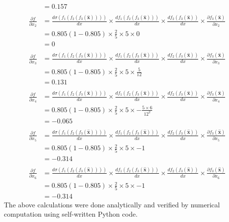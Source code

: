 \documentclass[11pt,english]{article}
\begin{document}
\begin{enumerate}
\begin{align*}
	&= 0.157 \\\\
	\frac{\partial f}{\partial x_2} &= \frac{d \sigma(f_1(f_2(f_3(\hat{\mathbf{x}}))))}{dx} \times \frac{d f_1(f_2(f_3(\hat{\mathbf{x}})))}{dx} \times \frac{d f_2(f_3(\hat{\mathbf{x}}))}{dx} \times \frac{\partial f_3(\hat{\mathbf{x}})}{\partial x_2} \\
	&= 0.805(1-0.805) \times \frac{2}{5} \times 5 \times 0 \\
	&= 0 \\\\
	\frac{\partial f}{\partial x_3} &= \frac{d \sigma(f_1(f_2(f_3(\hat{\mathbf{x}}))))}{dx} \times \frac{d f_1(f_2(f_3(\hat{\mathbf{x}})))}{dx} \times \frac{d f_2(f_3(\hat{\mathbf{x}}))}{dx} \times \frac{\partial f_3(\hat{\mathbf{x}})}{\partial x_3} \\
	&= 0.805(1-0.805) \times \frac{2}{5} \times 5 \times \frac{5}{12} \\
	&= 0.131 \\\\
	\frac{\partial f}{\partial x_4} &= \frac{d \sigma(f_1(f_2(f_3(\hat{\mathbf{x}}))))}{dx} \times \frac{d f_1(f_2(f_3(\hat{\mathbf{x}})))}{dx} \times \frac{d f_2(f_3(\hat{\mathbf{x}}))}{dx} \times \frac{\partial f_3(\hat{\mathbf{x}})}{\partial x_4} \\
	&= 0.805(1-0.805) \times \frac{2}{5} \times 5 \times -\frac{5 \times 6}{12^2} \\
	&= -0.065 \\\\
	\frac{\partial f}{\partial x_5} &= \frac{d \sigma(f_1(f_2(f_3(\hat{\mathbf{x}}))))}{dx} \times \frac{d f_1(f_2(f_3(\hat{\mathbf{x}})))}{dx} \times \frac{d f_2(f_3(\hat{\mathbf{x}}))}{dx} \times \frac{\partial f_3(\hat{\mathbf{x}})}{\partial x_5} \\
	&= 0.805(1-0.805) \times \frac{2}{5} \times 5 \times -1 \\
	&= -0.314 \\\\
		\frac{\partial f}{\partial x_6} &= \frac{d \sigma(f_1(f_2(f_3(\hat{\mathbf{x}}))))}{dx} \times \frac{d f_1(f_2(f_3(\hat{\mathbf{x}})))}{dx} \times \frac{d f_2(f_3(\hat{\mathbf{x}}))}{dx} \times \frac{\partial f_3(\hat{\mathbf{x}})}{\partial x_6} \\
	&= 0.805(1-0.805) \times \frac{2}{5} \times 5 \times -1 \\
	&= -0.314
	\end{align*}
	The above calculations were done analytically and verified by numerical computation using self-written Python code.
	\newpage
	

\end{enumerate}
\end{document}

